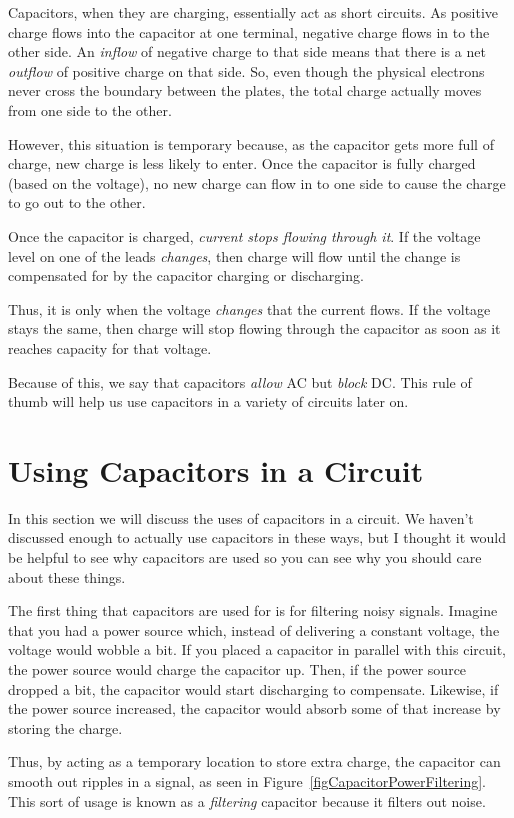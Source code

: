 Capacitors, when they are charging, essentially act as short circuits.
As positive charge flows into the capacitor at one terminal, negative charge flows in to the other side.
An \emph{inflow} of negative charge to that side means that there is a net \emph{outflow} of positive charge on that side.
So, even though the physical electrons never cross the boundary between the plates, the total charge actually moves from one side to the other.

However, this situation is temporary because, as the capacitor gets more full of charge, new charge is less likely to enter.
Once the capacitor is fully charged (based on the voltage), no new charge can flow in to one side to cause the charge to go out to the other.

Once the capacitor is charged, \emph{current stops flowing through it}.
If the voltage level on one of the leads \emph{changes}, then charge will flow until the change is compensated for by the capacitor charging or discharging.

Thus, it is only when the voltage \emph{changes} that the current flows.
If the voltage stays the same, then charge will stop flowing through the capacitor as soon as it reaches capacity for that voltage.

Because of this, we say that capacitors \emph{allow} AC but \emph{block} DC.
This rule of thumb will help us use capacitors in a variety of circuits later on.

\section{Using Capacitors in a Circuit}

In this section we will discuss the uses of capacitors in a circuit.
We haven't discussed enough to actually use capacitors in these ways, but I thought it would be helpful to see why capacitors are used so you can see why you should care about these things.

The first thing that capacitors are used for is for filtering noisy signals.
Imagine that you had a power source which, instead of delivering a constant voltage, the voltage would wobble a bit.
If you placed a capacitor in parallel with this circuit, the power source would charge the capacitor up.
Then, if the power source dropped a bit, the capacitor would start discharging to compensate.
Likewise, if the power source increased, the capacitor would absorb some of that increase by storing the charge.

Thus, by acting as a temporary location to store extra charge, the capacitor can smooth out ripples in a signal, as seen in Figure~\ref{figCapacitorPowerFiltering}.
This sort of usage is known as a \emph{filtering} capacitor because it filters out noise.

